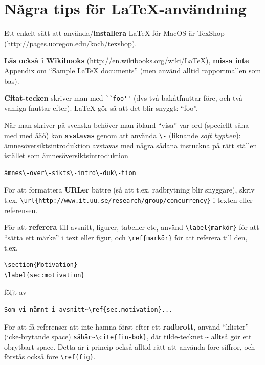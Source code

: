 \documentclass[swedish, a4paper,12pt]{article}
\begin{document}
\section{Några tips för La\TeX-användning}

Ett enkelt sätt att använda/\textbf{installera} LaTeX för MacOS är TexShop (\url{http://pages.uoregon.edu/koch/texshop}).

\textbf{Läs också i Wikibooks} (\url{http://en.wikibooks.org/wiki/LaTeX}), \textbf{missa inte} Appendix om ``Sample LaTeX documents'' (men använd alltid rapportmallen som bas).

\textbf{Citat-tecken} skriver man med \verb|``foo''| (dvs två bakåtfnuttar före, och två vanliga fnuttar efter). LaTeX gör så att det blir snyggt: ``foo''.

När man skriver på svenska behöver man ibland ``visa'' var ord (speciellt såna med med åäö) kan \textbf{avstavas} genom att använda \verb|\-| (liknande \textit{soft hyphen}): ämnesöversiktsintroduktion avstavas med några sådana instuckna på rätt ställen istället som ämnes\-över\-sikts\-intro\-duk\-tion

\begin{verbatim}
ämnes\-över\-sikts\-intro\-duk\-tion
\end{verbatim}

För att formattera \textbf{URLer} bättre (så att t.ex. radbrytning blir snyggare), skriv t.ex. \verb|\url{http://www.it.uu.se/research/group/concurrency}| i texten eller referensen.

För att \textbf{referera} till avsnitt, figurer, tabeller etc, använd \verb|\label{markör}| för att ``sätta ett märke'' i text eller figur, och \verb|\ref{markör}| för att referera till den, t.ex.
\begin{verbatim}
\section{Motivation}
\label{sec:motivation}
\end{verbatim}

följt av
\begin{verbatim}
Som vi nämnt i avsnitt~\ref{sec.motivation}...
\end{verbatim}

För att få referenser att inte hamna först efter ett \textbf{radbrott}, använd ``klister'' (icke-brytande space) \verb|såhär~\cite{fin-bok}|, där tilde-tecknet \verb|~| alltså gör ett obrytbart space. Detta är i princip också alltid rätt att använda före siffror, och förstås också före \verb|\ref{fig}|.
\end{document}
